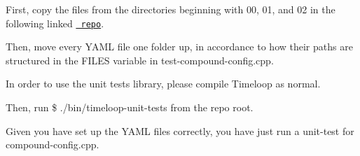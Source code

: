 
\begin{DoxyEnumerate}
\item First, copy the files from the directories beginning with 00, 01, and 02 in the following linked \href{https://github.com/Accelergy-Project/timeloop-accelergy-exercises/tree/master/workspace/exercises/2020.ispass/timeloop}{\texttt{ repo}}.
\item Then, move every Y\+A\+ML file one folder up, in accordance to how their paths are structured in the F\+I\+L\+ES variable in test-\/compound-\/config.\+cpp.
\item In order to use the unit tests library, please compile Timeloop as normal.
\item Then, run {\ttfamily \$ ./bin/timeloop-\/unit-\/tests} from the repo root.
\item Given you have set up the Y\+A\+ML files correctly, you have just run a unit-\/test for compound-\/config.\+cpp. 
\end{DoxyEnumerate}